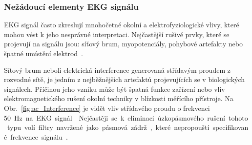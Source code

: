 \subsubsection{Nežádoucí elementy EKG signálu}
\label{section:artifacts_theory}
EKG signál často zkreslují mnohočetné okolní a elektrofyziologické vlivy, které
mohou vést k jeho nesprávné interpretaci. Nejčastější rušivé prvky, které se
projevují na signálu jsou: síťový brum, myopotenciály, pohybové artefakty nebo
špatné umístění elektrod~\cite{Surawicz2008}.

Sítový brum neboli elektrická interference generovaná střídavým proudem z
rozvodné sítě, je jedním z nejběžnějších artefaktů projevujících se v
biologických signálech. Příčinou jeho vzniku může být špatná funkce zařízení nebo
vliv elektromagnetického rušení okolní techniky v blízkosti měřícího přístroje.
Na Obr.~\ref{fig:ac_Interference} je vidět vliv střídavého proudu o frekvenci
50~\si\Hz~na EKG signál~\cite{Goldberger2017}. Nejčastěji se k eliminaci
úzkopásmového rušení tohoto typu volí filtry navržené jako pásmová zádrž, které
nepropouští specifikované frekvence signálu~\cite{Kher2019}.

